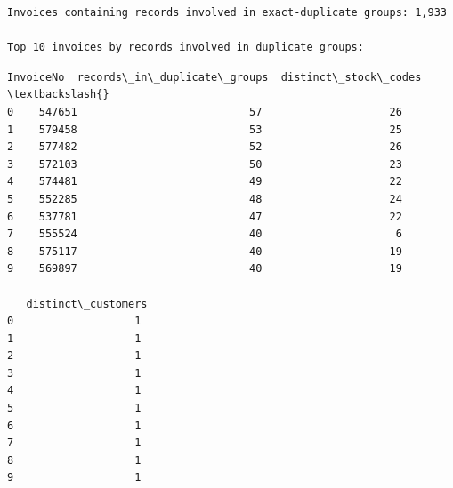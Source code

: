 \documentclass[11pt]{article}
\begin{document}
    \begin{Verbatim}[commandchars=\\\{\}]
Invoices containing records involved in exact-duplicate groups: 1,933

Top 10 invoices by records involved in duplicate groups:
    \end{Verbatim}

    
    \begin{Verbatim}[commandchars=\\\{\}]
  InvoiceNo  records\_in\_duplicate\_groups  distinct\_stock\_codes  \textbackslash{}
0    547651                           57                    26   
1    579458                           53                    25   
2    577482                           52                    26   
3    572103                           50                    23   
4    574481                           49                    22   
5    552285                           48                    24   
6    537781                           47                    22   
7    555524                           40                     6   
8    575117                           40                    19   
9    569897                           40                    19   

   distinct\_customers  
0                   1  
1                   1  
2                   1  
3                   1  
4                   1  
5                   1  
6                   1  
7                   1  
8                   1  
9                   1  
    \end{Verbatim}
\end{document}
